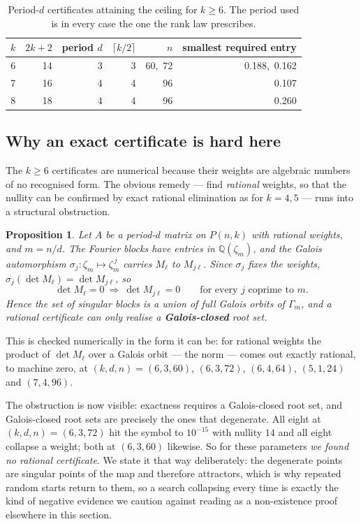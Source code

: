 \documentclass[11pt]{article}
\newtheorem{proposition}[theorem]{Proposition}
\theoremstyle{definition}
\begin{document}
\begin{table}[h]\centering
\begin{tabular}{crrrrr}
\toprule
$k$ & $2k+2$ & period $d$ & $\lceil k/2\rceil$ & $n$ & smallest required entry \\
\midrule
6 & 14 & 3 & 3 & 60,\ 72 & 0.188,\ 0.162 \\
7 & 16 & 4 & 4 & 96 & 0.107 \\
8 & 18 & 4 & 4 & 96 & 0.260 \\
\bottomrule
\end{tabular}
\caption{Period-$d$ certificates attaining the ceiling for $k\ge6$. The period
used is in every case the one the rank law prescribes.}
\end{table}

\subsection*{Why an exact certificate is hard here}
The $k\ge6$ certificates are numerical because their weights are algebraic
numbers of no recognised form. The obvious remedy --- find \emph{rational}
weights, so that the nullity can be confirmed by exact rational elimination as
for $k=4,5$ --- runs into a structural obstruction.

\begin{proposition}\label{prop:ratobs}
Let $A$ be a period-$d$ matrix on $P(n,k)$ with \emph{rational} weights, and
$m=n/d$. The Fourier blocks have entries in $\mathbb Q(\zeta_m)$, and the
Galois automorphism $\sigma_j:\zeta_m\mapsto\zeta_m^{\,j}$ carries $M_\ell$ to
$M_{j\ell}$. Since $\sigma_j$ fixes the weights,
$\sigma_j(\det M_\ell)=\det M_{j\ell}$, so
\[
  \det M_\ell=0\ \Longrightarrow\ \det M_{j\ell}=0
  \qquad\text{for every } j \text{ coprime to } m .
\]
Hence the set of singular blocks is a union of full Galois orbits of
$\Gamma_m$, and a rational certificate can only realise a \textbf{Galois-closed}
root set.
\end{proposition}

\noindent
This is checked numerically in the form it can be: for rational weights the
product of $\det M_\ell$ over a Galois orbit --- the norm --- comes out exactly
rational, to machine zero, at $(k,d,n)=(6,3,60)$, $(6,3,72)$, $(6,4,64)$,
$(5,1,24)$ and $(7,4,96)$.

The obstruction is now visible: exactness requires a Galois-closed root set,
and Galois-closed root sets are precisely the ones that degenerate. All eight
at $(k,d,n)=(6,3,72)$ hit the symbol to $10^{-15}$ with nullity $14$ and all
eight collapse a weight; both at $(6,3,60)$ likewise. So for these parameters
\emph{we found no rational certificate}. We state it that way deliberately: the
degenerate points are singular points of the map and therefore attractors, which
is why repeated random starts return to them, so a search collapsing every time
is exactly the kind of negative evidence we caution against reading as a
non-existence proof elsewhere in this section.
\end{document}
